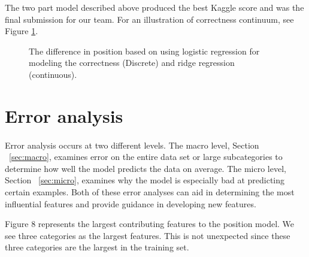 \documentclass[letterpaper]{article}
\begin{document}
The two part model described above produced the best Kaggle score and was the final submission for our team.  For an illustration of correctness continuum, see Figure \ref{fig:corr_cont}.  

\begin{figure}[H]
	\begin{center}
	\end{center}
	\caption{The difference in position based on using logistic regression for modeling the correctness (Discrete) and ridge regression (continuous).}
	\label{fig:corr_cont}
\end{figure}

\section{Error analysis}
\paragraph{} Error analysis occurs at two different levels.  The macro level, Section ~\ref{sec:macro}, examines error on the entire data set or large subcategories to determine how well the model predicts the data on average.  The micro level, Section ~\ref{sec:micro}, examines why the model is especially bad at predicting certain examples.  Both of these error analyses can aid in determining the most influential features and provide guidance in developing new features.  

Figure 8 represents the largest contributing features to the position model.  We see three categories as the largest features.  This is not unexpected since these three categories are the largest in the training set.  
\end{document}
